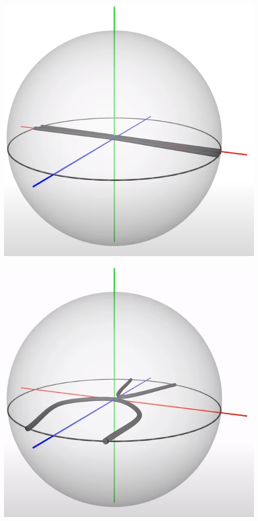 \documentclass[10pt]{beamer}
\begin{document}
    \includegraphics[scale=0.1]{Pictures/4pisphere1.png}

    \includegraphics[scale=0.1]{Pictures/4pisphere2.png}
\end{document}
